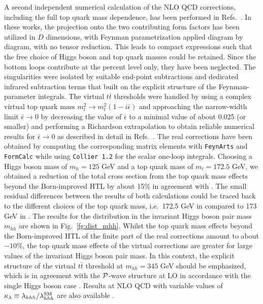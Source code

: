 \noindent A second independent numerical calculation of the NLO QCD corrections, including the full top quark mass dependence, has been performed in Refs.~\cite{Baglio:2018lrj,Baglio:2020ini,Baglio:2020wgt}. In these works, the projection onto the two contributing form factors has been utilized in $D$ dimensions, with Feynman parametrization applied diagram by diagram, with no tensor reduction. This leads to compact expressions such that the free choice of Higgs boson and top quark masses could be retained. Since the bottom loops contribute at the percent level only, they have been neglected. The singularities were isolated by suitable end-point subtractions and dedicated infrared subtraction terms that built on the explicit structure of the Feynman-parameter integrals. The virtual $t\bar t$ thresholds were handled by using a complex virtual top quark mass $m_t^2 \to m_t^2 (1-i\bar\epsilon)$ and approaching the narrow-width limit $\bar\epsilon\to 0$ by decreasing the value of $\bar\epsilon$ to a minimal value of about 0.025 (or smaller) and performing a Richardson extrapolation \cite{Richardson} to obtain reliable numerical results for $\bar\epsilon\to 0$ as described in detail in Refs.~\cite{Baglio:2018lrj,Baglio:2020ini}. The real corrections have been obtained by computing the corresponding matrix elements with {\tt FeynArts} \cite{Hahn:2000kx} and {\tt FormCalc} \cite{Hahn:1998yk} while using {\tt Collier~1.2} \cite{Denner:2016kdg} for the scalar one-loop integrals. Choosing a Higgs boson mass of $m_h=125$ GeV and a top quark mass of $m_t=172.5$ GeV, we obtained a reduction of the total cross section from the top quark mass effects beyond the Born-improved HTL by about 15\% in agreement with \cite{Borowka:2016ypz,Borowka:2016ehy}. The small residual differences between the results of both calculations could be traced back to the different choices of the top quark mass, i.e.~172.5 GeV in \cite{Baglio:2018lrj,Baglio:2020ini} compared to 173 GeV in \cite{Borowka:2016ypz,Borowka:2016ehy}. The results for the distribution in the invariant Higgs boson pair mass $m_{hh}$ are shown in Fig.~\ref{fg:dist_mhh}. Whilst the top quark mass effects beyond the Born-improved HTL of the finite part of the real corrections amount to about $-10\%$, the top quark mass effects of the virtual corrections are greater for large values of the invariant Higgs boson pair mass. In this context, the explicit structure of the virtual $t\bar t$ threshold at $m_{hh} = 345$ GeV should be emphasized, which is in agreement with the ${\cal P}$-wave structure at LO in accordance with the single Higgs boson case \cite{Graudenz:1992pv,Spira:1995rr}. Results at NLO QCD with variable values of $\kappa_\lambda \equiv \lambda_{hhh}/\lambda_{hhh}^{\rm SM}$ are also available \cite{Baglio:2020ini,Baglio:2020wgt}.

